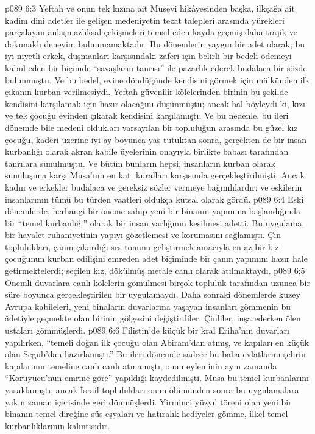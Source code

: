 \vs p089 6:3 Yeftah ve onun tek kızına ait Musevi hikâyesinden başka, ilkçağa ait kadim dini adetler ile gelişen medeniyetin tezat talepleri arasında yürekleri parçalayan anlaşmazlıksal çekişmeleri temsil eden kayda geçmiş daha trajik ve dokunaklı deneyim bulunmamaktadır. Bu dönemlerin yaygın bir adet olarak; bu iyi niyetli erkek, düşmanları karşısındaki zaferi için belirli bir bedeli ödemeyi kabul eden bir biçimde “savaşların tanrısı” ile pazarlık ederek budalaca bir sözde bulunmuştu. Ve bu bedel, evine döndüğünde kendisini görmek için mülkünden ilk çıkanın kurban verilmesiydi. Yeftah güvenilir kölelerinden birinin bu şekilde kendisini karşılamak için hazır olacağını düşünmüştü; ancak hal böyleydi ki, kızı ve tek çocuğu evinden çıkarak kendisini karşılamıştı. Ve bu nedenle, bu ileri dönemde bile medeni oldukları varsayılan bir topluluğun arasında bu güzel kız çocuğu, kaderi üzerine iyi ay boyunca yas tutuktan sonra, gerçekten de bir insan kurbanlığı olarak akran kabile üyelerinin onayıyla birlikte babası tarafından tanrılara sunulmuştu. Ve bütün bunların hepsi, insanların kurban olarak sunuluşuna karşı Musa’nın en katı kuralları karşısında gerçekleştirilmişti. Ancak kadın ve erkekler budalaca ve gereksiz sözler vermeye bağımlılardır; ve eskilerin insanlarının tümü bu türden vaatleri oldukça kutsal olarak gördü.
\vs p089 6:4 Eski dönemlerde, herhangi bir öneme sahip yeni bir binanın yapımına başlandığında bir “temel kurbanlığı” olarak bir insan varlığının kesilmesi adetti. Bu uygulama, bir hayalet ruhaniyetinin yapıyı gözetlemesi ve korumasını sağlamıştı. Çin toplulukları, çanın çıkardığı ses tonunu geliştirmek amacıyla en az bir kız çocuğunun kurban edilişini emreden adet biçiminde bir çanın yapımını hazır hale getirmektelerdi; seçilen kız, dökülmüş metale canlı olarak atılmaktaydı.
\vs p089 6:5 Önemli duvarlara canlı kölelerin gömülmesi birçok topluluk tarafından uzunca bir süre boyunca gerçekleştirilen bir uygulamaydı. Daha sonraki dönemlerde kuzey Avrupa kabileleri, yeni binaların duvarlarına yaşayan insanları gömmenin bu âdetiyle geçmekte olan birinin gölgesini değiştirdiler. Çinliler, inşa ederken ölen ustaları gömmüşlerdi.
\vs p089 6:6 Filistin’de küçük bir kral Eriha’nın duvarları yapılırken, “temeli doğan ilk çocuğu olan Abiram’dan atmış, ve kapıları en küçük olan Segub’dan hazırlamıştı.” Bu ileri dönemde sadece bu baba evlatlarını şehrin kapılarının temeline canlı canlı atmamıştı, onun eyleminin aynı zamanda “Koruyucu’nun emrine göre” yapıldığı kaydedilmişti. Musa bu temel kurbanlarını yasaklamıştı; ancak İsrail toplulukları onun ölümünden sonra bu uygulamalara yakın zaman içerisinde geri dönmüşlerdi. Yirminci yüzyıl töreni olan yeni bir binanın temel direğine süs eşyaları ve hatıralık hediyeler gömme, ilkel temel kurbanlıklarının kalıntısıdır.
